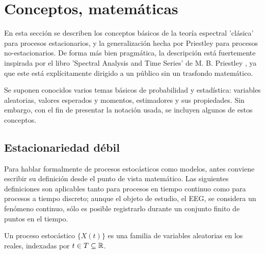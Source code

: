 
\section{Conceptos, matem\'aticas}

En esta secci\'on se describen los conceptos b\'asicos de la teor\'ia espectral 'cl\'asica' para 
procesos estacionarios, y la generalizaci\'on hecha por Priestley para procesos no-estacionarios. 
De forma m\'as bien pragm\'atica, la descripci\'on est\'a
 fuertemente inspirada por el libro 'Spectral Analysis and Time Series' 
de M. B. Priestley \cite{Priestley81}, ya que este est\'a expl\'icitamente dirigido a un p\'ublico 
sin un trasfondo matem\'atico.

Se suponen conocidos varios temas b\'asicos de probabilidad y estad\'istica:
variables aleatorias, valores esperados y momentos, estimadores y sus propiedades.
Sin embargo, con el fin de presentar la notaci\'on usada, se incluyen algunos 
de estos conceptos.


\subsection{Estacionariedad d\'ebil}

Para hablar formalmente de procesos estoc\'asticos como modelos, antes 
conviene escribir su definici\'on desde el punto de vista matem\'atico. Las siguientes definiciones
son aplicables tanto para procesos en tiempo continuo
como para procesos a tiempo discreto; aunque el objeto de estudio, el EEG, se considera 
un fen\'omeno continuo, s\'olo es posible registrarlo durante un conjunto finito de puntos 
en el tiempo.

\begin{defn}
Un proceso estoc\'astico $\{ X(t) \}$ es una familia de variables aleatorias 
en los reales,
indexadas por
$t \in T \subseteq \mathbb{R}$.
\end{defn}

